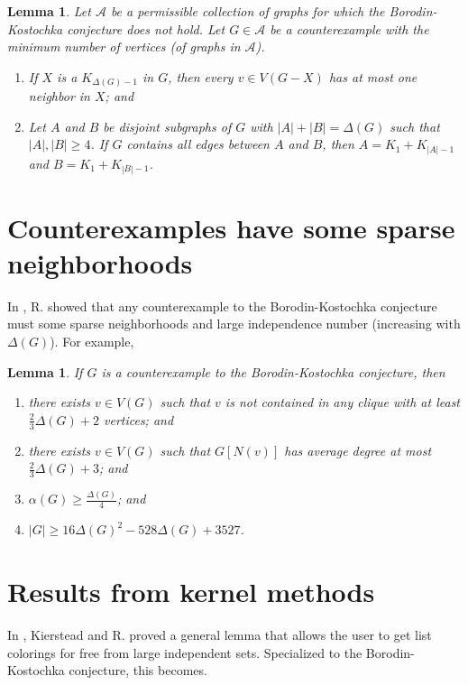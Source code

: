 \documentclass[12pt]{article}
\theoremstyle{plain}
\newtheorem{lem}[thm]{Lemma}
\theoremstyle{definition}
\theoremstyle{remark}
\newcommand{\fancy}[1]{\mathcal{#1}}
\newcommand{\card}[1]{\left|#1\right|}
\def\A{\fancy{A}}
\begin{document}
\begin{lem}
Let $\A$ be a permissible collection of graphs for which the Borodin-Kostochka conjecture does not hold.  Let $G \in \A$ be a counterexample with the minimum number of 
vertices (of graphs in $\A$). 
\begin{enumerate}
\item If $X$ is a $K_{\Delta(G) - 1}$ in $G$, then every $v \in V(G-X)$ has at most one neighbor in $X$; and
\item Let $A$ and $B$ be disjoint subgraphs of $G$ with $\card{A} + \card{B} = \Delta(G)$ such that $\card{A},\card{B} \ge 4$.  If $G$ contains all edges between $A$ and $B$,
then $A = K_1 + K_{\card{A} - 1}$ and $B = K_1 + K_{\card{B} - 1}$.
\end{enumerate}

\end{lem}

\section{Counterexamples have some sparse neighborhoods}\label{sparseneighborhoods}
In \cite{denseneighborhoods}, R. showed that any counterexample to the Borodin-Kostochka conjecture must some sparse neighborhoods and large 
independence number (increasing with $\Delta(G)$).  For example,
\begin{lem}
If $G$ is a counterexample to the Borodin-Kostochka conjecture, then
\begin{enumerate}
\item there exists $v \in V(G)$ such that $v$ is not contained in any clique with at least $\frac23\Delta(G) + 2$ vertices; and
\item there exists $v \in V(G)$ such that $G[N(v)]$ has average degree at most $\frac23\Delta(G) + 3$; and
\item $\alpha(G) \ge \frac{\Delta(G)}{4}$; and 
\item $\card{G} \ge 16\Delta(G)^2 - 528\Delta(G) + 3527$.
\end{enumerate}
\end{lem}

\section{Results from kernel methods}
In \cite{KernelMagic}, Kierstead and R. proved a general lemma that allows the user to get list colorings for free from large independent sets.  
Specialized to the Borodin-Kostochka conjecture,
this becomes.
\end{document}
